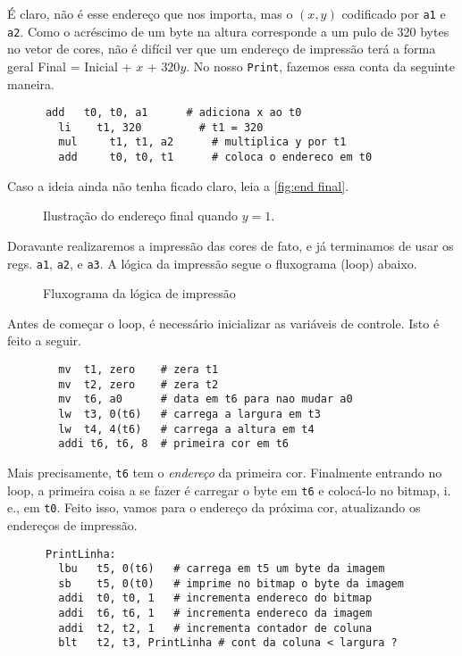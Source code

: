 \documentclass[10pt, a4paper, twoside]{article}
\begin{document}
      É claro, não é esse endereço que nos importa, mas o $(x,y)$ codificado por {\tt a1} e {\tt a2}.
      Como o acréscimo de um byte na altura corresponde a um pulo de 320 bytes no vetor de cores, não é difícil ver que um endereço de impressão terá a forma geral 
      Final = Inicial + $x$ + $320y$.
      No nosso {\tt Print}, fazemos essa conta da seguinte maneira.
      \begin{lstlisting}
      add 	t0, t0, a1 		# adiciona x ao t0
    	li 	  t1, 320 		  # t1 = 320
    	mul 	t1, t1, a2 		# multiplica y por t1
    	add 	t0, t0, t1 		# coloca o endereco em t0
      \end{lstlisting}
      Caso a ideia ainda não tenha ficado claro, leia a \autoref{fig:end final}.
      \begin{figure}[H]\centering
        \caption{Ilustração do endereço final quando $y=1$.}
        \label{fig:end final}
        
      \end{figure}
      Doravante realizaremos a impressão das cores de fato, e já terminamos de usar os regs. {\tt a1}, {\tt a2}, e {\tt a3}.
      A lógica da impressão segue o fluxograma (loop) abaixo.
      \begin{figure}[H]\centering
        \caption{Fluxograma da lógica de impressão}
        \label{fig:fluxograma Print}
        
      \end{figure}
      Antes de começar o loop, é necessário inicializar as variáveis de controle. Isto é feito a seguir.
      \begin{lstlisting}
        mv  t1, zero    # zera t1
        mv  t2, zero    # zera t2
        mv  t6, a0      # data em t6 para nao mudar a0
        lw 	t3, 0(t6)   # carrega a largura em t3
        lw 	t4, 4(t6)   # carrega a altura em t4
        addi t6, t6, 8  # primeira cor em t6
      \end{lstlisting}
      Mais precisamente, {\tt t6} tem o \textit{endereço} da primeira cor.
      Finalmente entrando no loop, a primeira coisa a se fazer é carregar o byte em {\tt t6} e colocá-lo no bitmap, i. e., em {\tt t0}. 
      Feito isso, vamos para o endereço da próxima cor, atualizando os endereços de impressão.
      \begin{lstlisting}
      PrintLinha:
        lbu   t5, 0(t6)   # carrega em t5 um byte da imagem
        sb    t5, 0(t0)   # imprime no bitmap o byte da imagem
        addi  t0, t0, 1   # incrementa endereco do bitmap
        addi  t6, t6, 1   # incrementa endereco da imagem
        addi  t2, t2, 1   # incrementa contador de coluna
        blt   t2, t3, PrintLinha # cont da coluna < largura ?
      \end{lstlisting}
\end{document}
